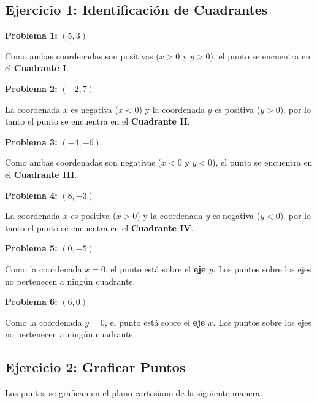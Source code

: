 
\subsection*{Ejercicio 1: Identificación de Cuadrantes}

\textbf{Problema 1:} $(5, 3)$

Como ambas coordenadas son positivas ($x > 0$ y $y > 0$), el punto se encuentra en el \textbf{Cuadrante I}.

\medskip

\textbf{Problema 2:} $(-2, 7)$

La coordenada $x$ es negativa ($x < 0$) y la coordenada $y$ es positiva ($y > 0$), por lo tanto el punto se encuentra en el \textbf{Cuadrante II}.

\medskip

\textbf{Problema 3:} $(-4, -6)$

Como ambas coordenadas son negativas ($x < 0$ y $y < 0$), el punto se encuentra en el \textbf{Cuadrante III}.

\medskip

\textbf{Problema 4:} $(8, -3)$

La coordenada $x$ es positiva ($x > 0$) y la coordenada $y$ es negativa ($y < 0$), por lo tanto el punto se encuentra en el \textbf{Cuadrante IV}.

\medskip

\textbf{Problema 5:} $(0, -5)$

Como la coordenada $x = 0$, el punto está sobre el \textbf{eje $y$}. Los puntos sobre los ejes no pertenecen a ningún cuadrante.

\medskip

\textbf{Problema 6:} $(6, 0)$

Como la coordenada $y = 0$, el punto está sobre el \textbf{eje $x$}. Los puntos sobre los ejes no pertenecen a ningún cuadrante.

\newpage

\subsection*{Ejercicio 2: Graficar Puntos}

Los puntos se grafican en el plano cartesiano de la siguiente manera:


